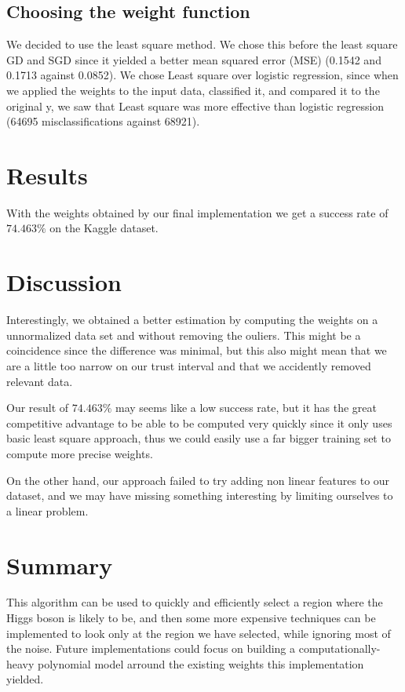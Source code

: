 \documentclass[10pt,conference,compsocconf]{IEEEtran}
\begin{document}
\subsection{Choosing the weight function} We decided to use the least square method. We chose this before the least square GD and SGD since it yielded a better mean squared error (MSE) (0.1542 and 0.1713 against 0.0852). We chose Least square over logistic regression, since when we applied the weights to the input data, classified it, and compared it to the original y, we saw that Least square was more effective than logistic regression (64695 misclassifications against 68921).
\section{Results}
With the weights obtained by our final implementation we get a success rate of $74.463\%$ on the Kaggle dataset.

\section{Discussion}
Interestingly, we obtained a better estimation by computing the weights on a unnormalized data set and without removing the ouliers. This might be a coincidence since the difference was minimal, but this also might mean that we are a little too narrow on our trust interval and that we accidently removed relevant data.

Our result of $74.463\%$ may seems like a low success rate, but it has the great competitive advantage to be able to be computed very quickly since it only uses basic least square approach, thus we could easily use a far bigger training set to compute more precise weights.

On the other hand, our approach failed to try adding non linear features to our dataset, and we may have missing something interesting by limiting ourselves to a linear problem.

\section{Summary}
This algorithm can be used to quickly and efficiently select a region where the Higgs boson is likely to be, and then some more expensive techniques can be implemented to look only at the region we have selected, while ignoring most of the noise. Future implementations could focus on building a computationally-heavy polynomial model arround the existing weights this implementation yielded. 



\end{document}
